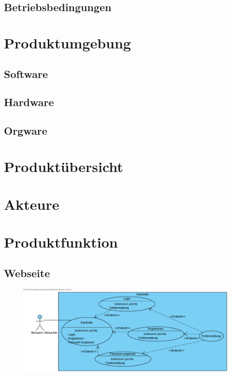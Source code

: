 \documentclass[10pt,a4paper]{article}
\begin{document}
\subsection{Betriebsbedingungen}

\section{Produktumgebung}
\subsection{Software}
\subsection{Hardware}
\subsection{Orgware}

\section{Produkt\"ubersicht}

\section{Akteure}

\section{Produktfunktion}
\subsection{Webseite}
\begin{figure}[h]
	\includegraphics[width=\linewidth,]{gfx/webseite/startseite.pdf}	
\end{figure}
\end{document}
